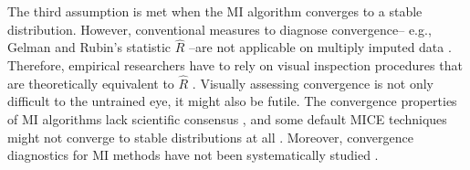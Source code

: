 \documentclass[article]{jss}
\begin{document}
The third assumption is met when the MI algorithm converges to a stable distribution. However, conventional measures to diagnose convergence-- e.g., Gelman and Rubin's \citeyear{gelm92} statistic $\widehat{R}$ --are not applicable on multiply imputed data \citep{lace07}. Therefore, empirical researchers have to rely on visual inspection procedures that are theoretically equivalent to $\widehat{R}$ \citep{whit11}. Visually assessing convergence is not only difficult to the untrained eye, it might also be futile. The convergence properties of MI algorithms lack scientific consensus \citep{taka17}, and some default MICE techniques might not converge to stable distributions at all \citep{murr18}. Moreover, convergence diagnostics for MI methods have not been systematically studied \citep{buur18}.

\end{document}
